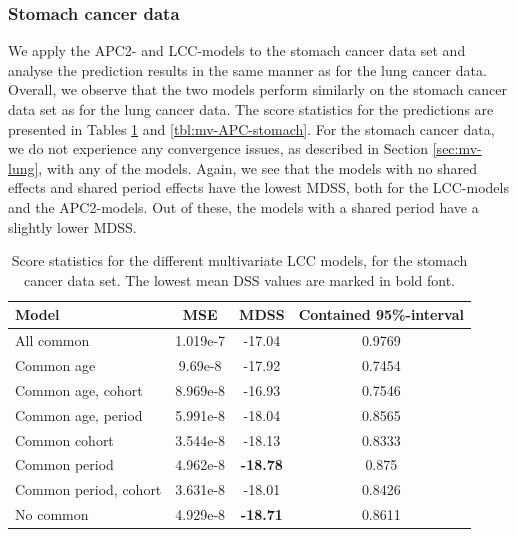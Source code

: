 \newpage
\subsubsection{Stomach cancer data}
We apply the APC2- and LCC-models to the stomach cancer data set and analyse the prediction results in the same manner as for the lung cancer data. Overall, we observe that the two models perform similarly on the stomach cancer data set as for the lung cancer data. The score statistics for the predictions are presented in Tables \ref{tbl:mv-LCC-stomach} and \ref{tbl:mv-APC-stomach}. For the stomach cancer data, we do not experience any convergence issues, as described in Section \ref{sec:mv-lung}, with any of the models. Again, we see that the models with no shared effects and shared period effects have the lowest MDSS, both for the LCC-models and the APC2-models. Out of these, the models with a shared period have a slightly lower MDSS.  

\begin{table}
    \begin{center}
        \begin{tabular}{l |c c c }
            Model & MSE & MDSS & Contained 95\%-interval\\
            \hline
            All common            & 1.019e-7  & -17.04    & 0.9769 \\
            Common age            &  9.69e-8 & -17.92    & 0.7454 \\
            Common age, cohort    & 8.969e-8 & -16.93    & 0.7546 \\
            Common age, period    & 5.991e-8 & -18.04    & 0.8565 \\
            Common cohort         &  3.544e-8 & -18.13   & 0.8333 \\
            Common period         &  4.962e-8 & \textbf{-18.78}   & 0.875  \\
            Common period, cohort & 3.631e-8 & -18.01    & 0.8426 \\
            No common            &  4.929e-8 & \textbf{-18.71}    & 0.8611 \\
        \end{tabular}
        \caption{Score statistics for the different multivariate LCC models, for the stomach cancer data set. The lowest mean DSS values are marked in bold font. }\label{tbl:mv-LCC-stomach}
    \end{center}
\end{table}

